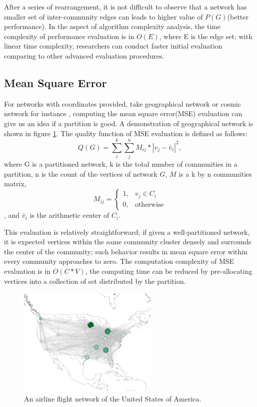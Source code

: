 \documentclass[12pt]{article}
\begin{document}
\bigbreak

After a series of rearrangement, it is not difficult to observe that a network has smaller set of inter-community edges can leads to higher value of $P(G)$(better performance)\cite{7}. In the aspect of algorithm complexity analysis, the time complexity of performance evaluation is in $O(E)$, where E is the edge set; with linear time complexity, researchers can conduct faster initial evaluation comparing to other advanced evaluation procedures.

\subsection{Mean Square Error}
For networks with coordinates provided, take geographical network or cosmic network for instance \cite{9,10}, computing the mean square error(MSE) evaluation can give us an idea if a partition is good. A demonstration of geographical network is shown in figure \ref{fig:fig_2}. The quality function of MSE evaluation is defined as follows:
    $$Q(G) = \sum_{i}^{k}\sum_{j}^{n} M_{i j} * |v_{j} - \bar{v}_{i}|^{2},$$
where G is a partitioned network, k is the total number of communities in a partition, n is the count of the vertices of network $G$, $M$ is a k by n communities matrix, \[
  M_{ij} = 
  \begin{cases}
    1, &  v_{j} \in C_i\\
    0, & \text{otherwise}
  \end{cases}
\]
, and $\bar{v}_{i}$ is the arithmetic center of $C_i$. 

\bigbreak

This evaluation is relatively straightforward; if given a well-partitioned network, it is expected vertices within the same community cluster densely and surrounds the center of the community; such behavior results in mean square error within every community approaches to zero. The computation complexity of MSE evaluation is in $O(C*V)$, the computing time can be reduced by pre-allocating vertices into a collection of set distributed by the partition.

\begin{figure}
\centering
\includegraphics[width=0.6\textwidth]{fig_2.png}

\caption{\label{fig:fig_2}An airline flight network of the United States of America\cite{11}.}
\end{figure}
\end{document}
